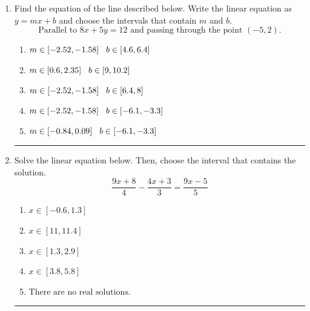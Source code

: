 \documentclass[14pt]{extbook}
\newcommand{\litem}[1]{\item#1\hspace*{-1cm}\rule{\textwidth}{0.4pt}}
\begin{document}
\begin{enumerate}
{\begin{enumerate}[label=\Alph*.]
\end{enumerate} }
\litem{
Find the equation of the line described below. Write the linear equation as $ y=mx+b $ and choose the intervals that contain $m$ and $b$.\[ \text{Parallel to } 8 x + 5 y = 12 \text{ and passing through the point } (-5, 2). \]\begin{enumerate}[label=\Alph*.]
\item \( m \in [-2.52, -1.58] \hspace*{3mm} b \in [4.6, 6.4] \)
\item \( m \in [0.6, 2.35] \hspace*{3mm} b \in [9, 10.2] \)
\item \( m \in [-2.52, -1.58] \hspace*{3mm} b \in [6.4, 8] \)
\item \( m \in [-2.52, -1.58] \hspace*{3mm} b \in [-6.1, -3.3] \)
\item \( m \in [-0.84, 0.09] \hspace*{3mm} b \in [-6.1, -3.3] \)

\end{enumerate} }
\litem{
Solve the linear equation below. Then, choose the interval that contains the solution.\[ \frac{9x + 8}{4} - \frac{4x + 3}{3} = \frac{9x -5}{5} \]\begin{enumerate}[label=\Alph*.]
\item \( x \in [-0.6, 1.3] \)
\item \( x \in [11, 11.4] \)
\item \( x \in [1.3, 2.9] \)
\item \( x \in [3.8, 5.8] \)
\item \( \text{There are no real solutions.} \)

\end{enumerate} }
\end{enumerate}
\end{document}

